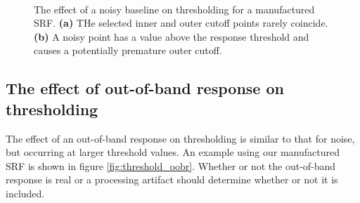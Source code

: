\begin{figure}[H]
\begin{tabular}{c c}
  \end{tabular} \\
  \caption{The effect of a noisy baseline on thresholding for a manufactured SRF. \textbf{(a)} THe selected inner and outer cutoff points rarely coincide. \textbf{(b)} A noisy point has a value above the response threshold and causes a potentially premature outer cutoff.}
  \label{fig:threshold_noise}
\end{figure}


\subsection{The effect of out-of-band response on thresholding}
The effect of an out-of-band response on thresholding is similar to that for noise, but occurring at larger threshold values. An example using our manufactured SRF is shown in figure \ref{fig:threshold_oobr}. Whether or not the out-of-band response is real or a processing artifact should determine whether or not it is included.
